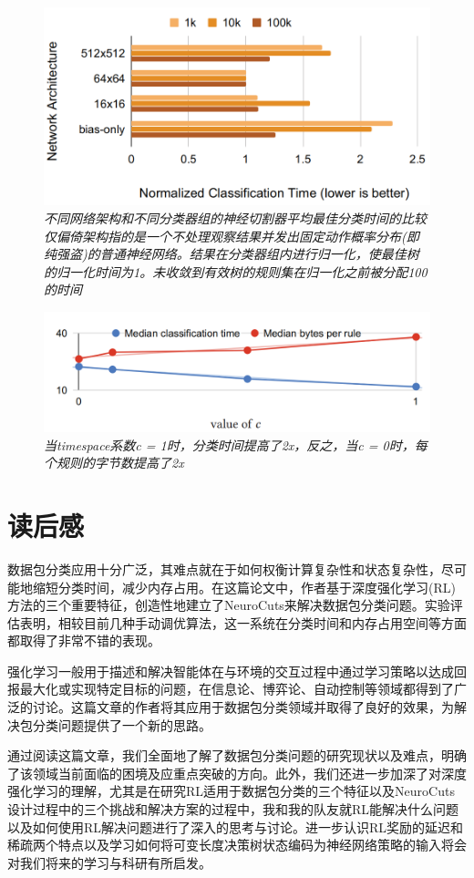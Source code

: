 \documentclass[UTF8,a4paper]{ctexart}
\begin{document}
\begin{figure}[H]
    \centering
    \includegraphics[width = \textwidth]{image017.png}
    \caption{\em 不同网络架构和不同分类器组的神经切割器平均最佳分类时间的比较仅偏倚架构指的是一个不处理观察结果并发出固定动作概率分布(即纯强盗)的普通神经网络。结果在分类器组内进行归一化，使最佳树的归一化时间为1。未收敛到有效树的规则集在归一化之前被分配100的时间}
    \label{fig:007}
\end{figure}
\begin{figure}[H]
    \centering
    \includegraphics[width = \textwidth]{image019.png}
    \caption{\em 当timespace系数c = 1时，分类时间提高了2x，反之，当c = 0时，每个规则的字节数提高了2x}
    \label{fig:008}
\end{figure}
\section{读后感}
数据包分类应用十分广泛，其难点就在于如何权衡计算复杂性和状态复杂性，尽可能地缩短分类时间，减少内存占用。在这篇论文中，作者基于深度强化学习(RL)方法的三个重要特征，创造性地建立了NeuroCuts来解决数据包分类问题。实验评估表明，相较目前几种手动调优算法，这一系统在分类时间和内存占用空间等方面都取得了非常不错的表现。
\par
强化学习一般用于描述和解决智能体在与环境的交互过程中通过学习策略以达成回报最大化或实现特定目标的问题，在信息论、博弈论、自动控制等领域都得到了广泛的讨论。这篇文章的作者将其应用于数据包分类领域并取得了良好的效果，为解决包分类问题提供了一个新的思路。\par
通过阅读这篇文章，我们全面地了解了数据包分类问题的研究现状以及难点，明确了该领域当前面临的困境及应重点突破的方向。此外，我们还进一步加深了对深度强化学习的理解，尤其是在研究RL适用于数据包分类的三个特征以及NeuroCuts设计过程中的三个挑战和解决方案的过程中，我和我的队友就RL能解决什么问题以及如何使用RL解决问题进行了深入的思考与讨论。进一步认识RL奖励的延迟和稀疏两个特点以及学习如何将可变长度决策树状态编码为神经网络策略的输入将会对我们将来的学习与科研有所启发。
\end{document}
